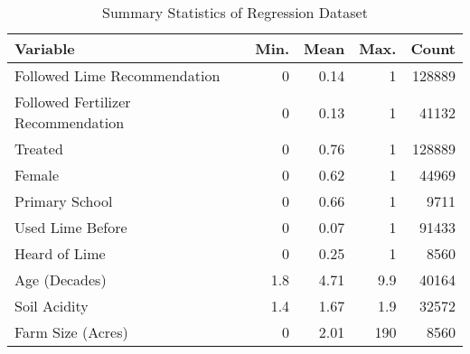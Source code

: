 \begin{table}[H]
\caption{Summary Statistics of Regression Dataset}
\centering
\footnotesize
\begin{tabular}{lrrrr}
\toprule
Variable & Min. & Mean & Max. & Count \\
\midrule
Followed Lime Recommendation & 0 & 0.14 & 1 & 128889 \\
Followed Fertilizer Recommendation & 0 & 0.13 & 1 & 41132 \\
Treated & 0 & 0.76 & 1 & 128889 \\
Female & 0 & 0.62 & 1 & 44969 \\
Primary School & 0 & 0.66 & 1 & 9711 \\
Used Lime Before & 0 & 0.07 & 1 & 91433 \\
Heard of Lime & 0 & 0.25 & 1 & 8560 \\
Age (Decades) & 1.8 & 4.71 & 9.9 & 40164 \\
Soil Acidity & 1.4 & 1.67 & 1.9 & 32572 \\
Farm Size (Acres) & 0 & 2.01 & 190 & 8560 \\
\bottomrule
\end{tabular}
\end{table}
